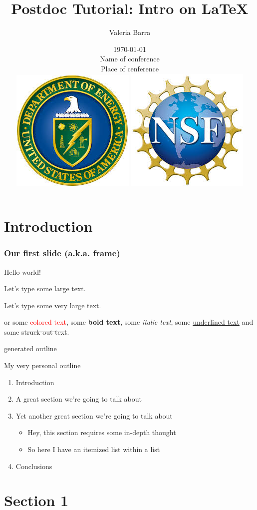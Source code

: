 \documentclass[aspectratio=169,mathserif,10pt]{beamer}
\title[Intro on \LaTeX]{Postdoc Tutorial: Intro on \LaTeX}
\author[Valeria Barra]{Valeria Barra}
\institute[Short institute]{Full institute: \\
University of Colorado Boulder}
\date[Short date]{
    \today \\ 
    Name of conference \\ 
    Place of cenference\\
    \centering
    \vspace{.7cm}
    \includegraphics[scale=0.2]{Images/DOELogo.jpg}
    \hspace{2cm}
    \includegraphics[scale=0.22]{Images/NSFLogo}
}
\newcommand{\nologo}{\setbeamertemplate{logo}{}}
\newcommand{\newslide}[2]
{\begin{frame}{#1}
\begin{center}
{#2}
\end{center}
\end{frame}}
\begin{document}
	
{\nologo 
    {
        \begin{frame}[noframenumbering]
            \maketitle
        \end{frame}
    }
}

\section[Intro]{Introduction}

\begin{frame}
\frametitle{Our first slide (a.k.a. frame)}
    
Hello world!

\pause
\Large{Let's type some large text.}

\pause
\LARGE{Let's type some very large text.}

\pause 
or some \textcolor{red}{colored text}, some \textbf{bold text}, some \emph{italic text}, some \underline{underlined text} and some \st{struck-out text}.
    
\end{frame}

{\newslideAutomatically generated outline}{
    \tableofcontents
}

\newslide{My very personal outline}{

\begin{enumerate}
    \item Introduction
    \item A great section we're going to talk about
    \item Yet another great section we're going to talk about
    \begin{itemize}
        \item Hey, this section requires some in-depth thought
        \item So here I have an itemized list within a list
    \end{itemize}
    \item Conclusions
\end{enumerate}

}

\section[Sec. 1]{Section 1}
\end{document}
